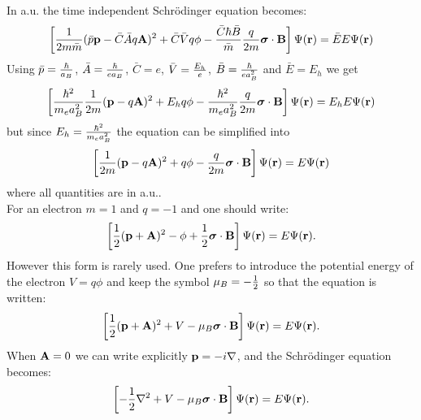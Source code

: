 \documentclass[12pt,a4paper]{article}
\begin{document}
{\color{web-blue} In a.u. the time independent Schr\"odinger equation
becomes:
\begin{equation}
\left[{1\over 2m \bar m} (\bar p {\bf p}-\bar C \bar A q {\bf A})^2 + 
\bar C \bar V q \phi - 
{\bar C \hbar \bar B \over \bar m} {q \over 2 m} 
{\boldsymbol \sigma} \cdot {\bf B} \right]
\Psi({\bf r})=\bar E E \Psi({\bf r})
\label{segen}
\end{equation}
Using $\bar p={\hbar \over a_B}$, $\bar A={\hbar \over e a_B}$, 
$\bar C=e$, $\bar V= {E_h \over e}$, $\bar B={\hbar \over e a_B^2}$ and
$\bar E=E_h$
we get
\begin{equation}
\left[{\hbar^2 \over m_e a_B^2} {1\over 2m} ({\bf p}-q {\bf A})^2 + 
E_h q \phi - {\hbar^2 \over m_e a_B^2} {q \over 2 m} 
{\boldsymbol \sigma} \cdot {\bf B} \right]
\Psi({\bf r})=E_h E \Psi({\bf r})
\end{equation}
but since $E_h= {\hbar^2 \over m_e a_B^2}$ the equation can be simplified into
\begin{equation}
\left[{1\over 2m} ({\bf p}-q {\bf A})^2 + 
q \phi - {q \over 2 m} 
{\boldsymbol \sigma} \cdot {\bf B} \right]
\Psi({\bf r})= E \Psi({\bf r})
\end{equation}
where all quantities are in a.u..\\

For an electron 
$m=1$ and $q=-1$ and one should write:
\begin{equation}
\left[{1\over 2} ({\bf p}+ {\bf A})^2  
- \phi + {1 \over 2} 
{\boldsymbol \sigma} \cdot {\bf B} \right]
\Psi({\bf r})= E \Psi({\bf r}).
\end{equation}
However this form is rarely used. One prefers to introduce the potential
energy of the electron $V=q\phi$ and keep the symbol $\mu_B=-{1\over 2}$ 
so that the equation is written:
\begin{equation}
\left[{1\over 2} ({\bf p}+ {\bf A})^2  
+ V - \mu_B {\boldsymbol \sigma} \cdot {\bf B} \right]
\Psi({\bf r})= E \Psi({\bf r}).
\end{equation}
When ${\bf A}=0$ we can write explicitly ${\bf p}=-i \nabla$, and
the Schr\"odinger equation becomes:
\begin{equation}
\left[-{1\over 2} \nabla^2  
+ V - \mu_B {\boldsymbol \sigma} \cdot {\bf B} \right]
\Psi({\bf r})= E \Psi({\bf r}).
\end{equation}
}
\\
\end{document}
